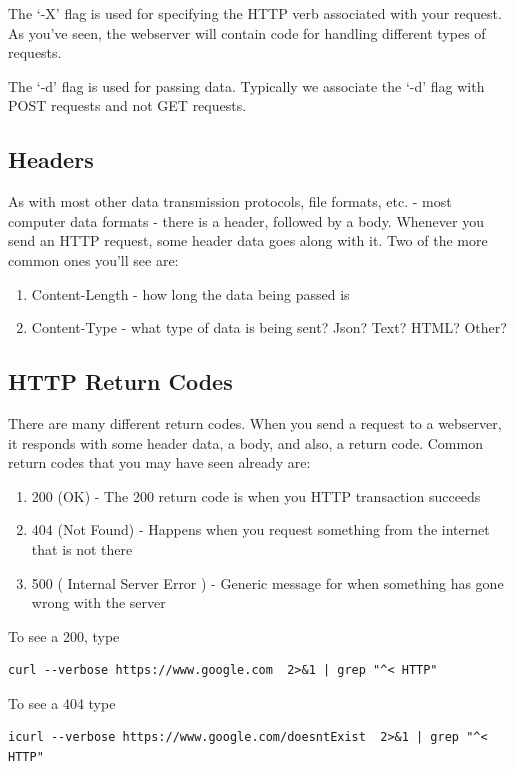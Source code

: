 \documentclass[10pt]{article}
\begin{document}
The `-X' flag is used for specifying the HTTP verb associated with your request. As you've seen, the webserver will contain code for handling different types of requests.

The `-d' flag is used for passing data. Typically we associate the `-d' flag with POST requests and not GET requests.

\subsection{Headers}
As with most other data transmission protocols, file formats, etc. - most computer data formats - there is a header, followed by a body. Whenever you send an HTTP request, some header data goes along with it. Two of the more common ones you'll see are:

\begin{enumerate}
\item Content-Length - how long the data being passed is
\item Content-Type - what type of data is being sent? Json? Text? HTML? Other?
\end{enumerate} 


\subsection{HTTP Return Codes}
There are many different return codes. When you send a request to a webserver, it responds with some header data, a body, and also, a return code. Common return codes that you may have seen already are:

\begin{enumerate}
\item 200 (OK) - The 200 return code is when you HTTP transaction succeeds
\item 404 (Not Found) - Happens when you request something from the internet that is not there
\item 500 ( Internal Server Error ) - Generic message for when something has gone wrong with the server
\end{enumerate}

To see a 200, type
\begin{lstlisting}
curl --verbose https://www.google.com  2>&1 | grep "^< HTTP"
\end{lstlisting}

To see a 404 type
\begin{lstlisting}
icurl --verbose https://www.google.com/doesntExist  2>&1 | grep "^< HTTP"
\end{lstlisting}
\end{document}
